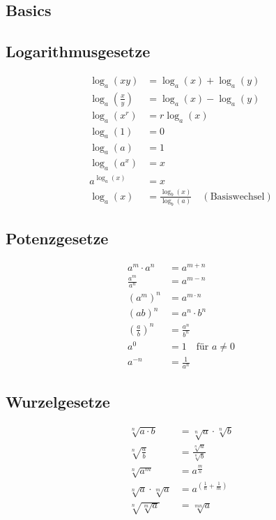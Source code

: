 \documentclass[a4paper,10pt]{article}
\begin{document}
\begin{multicols}{3}

\section{Basics}

\subsection{Logarithmusgesetze}

\begin{align*}
    \log_a(xy) &= \log_a(x) + \log_a(y) \\
    \log_a\left(\frac{x}{y}\right) &= \log_a(x) - \log_a(y) \\
    \log_a(x^r) &= r \log_a(x) \\
    \log_a(1) &= 0 \\
    \log_a(a) &= 1 \\
    \log_a(a^x) &= x \\
    a^{\log_a(x)} &= x \\
    \log_a(x) &= \frac{\log_b(x)}{\log_b(a)} \quad (\text{Basiswechsel})
\end{align*}

\subsection{Potenzgesetze}

\begin{align*}
    a^m \cdot a^n &= a^{m+n} \\
    \frac{a^m}{a^n} &= a^{m-n} \\
    (a^m)^n &= a^{m \cdot n} \\
    (ab)^n &= a^n \cdot b^n \\
    \left(\frac{a}{b}\right)^n &= \frac{a^n}{b^n} \\
    a^0 &= 1 \quad \text{für } a \neq 0 \\
    a^{-n} &= \frac{1}{a^n}
\end{align*}

\subsection{Wurzelgesetze}

\begin{align*}
    \sqrt[n]{a \cdot b} &= \sqrt[n]{a} \cdot \sqrt[n]{b} \\
    \sqrt[n]{\frac{a}{b}} &= \frac{\sqrt[n]{a}}{\sqrt[n]{b}} \\
    \sqrt[n]{a^m} &= a^{\frac{m}{n}} \\
    \sqrt[n]{a} \cdot \sqrt[m]{a} &= a^{\left(\frac{1}{n} + \frac{1}{m}\right)} \\
    \sqrt[n]{\sqrt[m]{a}} &= \sqrt[mn]{a}
\end{align*}


\end{multicols}
\end{document}
